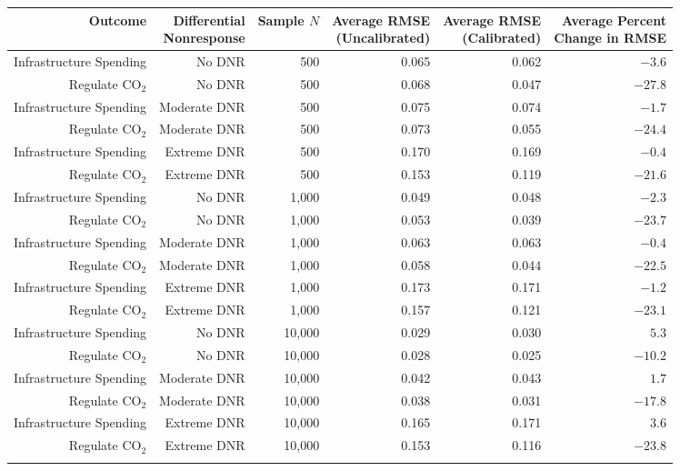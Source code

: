 
\begin{tabular}{rrrrrr}
\toprule
Outcome & \makecell{Differential\\Nonresponse} & Sample $N$ & \makecell{Average RMSE\\(Uncalibrated)} & \makecell{Average RMSE\\(Calibrated)} & \makecell{Average Percent\\Change in RMSE}\\
\midrule
Infrastructure Spending & No DNR & 500 & 0.065 & 0.062 & $-3.6$\\
Regulate CO$_2$ & No DNR & 500 & 0.068 & 0.047 & $-27.8$\\
\addlinespace
Infrastructure Spending & Moderate DNR & 500 & 0.075 & 0.074 & $-1.7$\\
Regulate CO$_2$ & Moderate DNR & 500 & 0.073 & 0.055 & $-24.4$\\
\addlinespace
Infrastructure Spending & Extreme DNR & 500 & 0.170 & 0.169 & $-0.4$\\
Regulate CO$_2$ & Extreme DNR & 500 & 0.153 & 0.119 & $-21.6$\\
\addlinespace
Infrastructure Spending & No DNR & 1,000 & 0.049 & 0.048 & $-2.3$\\
Regulate CO$_2$ & No DNR & 1,000 & 0.053 & 0.039 & $-23.7$\\
\addlinespace
Infrastructure Spending & Moderate DNR & 1,000 & 0.063 & 0.063 & $-0.4$\\
Regulate CO$_2$ & Moderate DNR & 1,000 & 0.058 & 0.044 & $-22.5$\\
\addlinespace
Infrastructure Spending & Extreme DNR & 1,000 & 0.173 & 0.171 & $-1.2$\\
Regulate CO$_2$ & Extreme DNR & 1,000 & 0.157 & 0.121 & $-23.1$\\
\addlinespace
Infrastructure Spending & No DNR & 10,000 & 0.029 & 0.030 & $5.3$\\
Regulate CO$_2$ & No DNR & 10,000 & 0.028 & 0.025 & $-10.2$\\
\addlinespace
Infrastructure Spending & Moderate DNR & 10,000 & 0.042 & 0.043 & $1.7$\\
Regulate CO$_2$ & Moderate DNR & 10,000 & 0.038 & 0.031 & $-17.8$\\
\addlinespace
Infrastructure Spending & Extreme DNR & 10,000 & 0.165 & 0.171 & $3.6$\\
Regulate CO$_2$ & Extreme DNR & 10,000 & 0.153 & 0.116 & $-23.8$\\
\addlinespace
\bottomrule
\end{tabular}